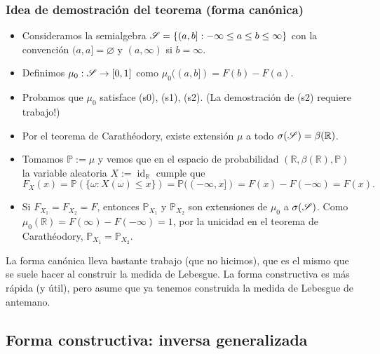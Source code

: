 \subsubsection{Idea de demostración del teorema (forma canónica)}

\begin{itemize}
	\item Consideramos la semialgebra \(\mathscr{S} = \{(a,b] : -\infty \le a \le b \le \infty\}\) con la convención \((a,a] = \varnothing\) y \((a,\infty)\) si \(b=\infty\).

    \item Definimos \(\mu_0: \mathscr{S} \to [0,1]\) como \(\mu_0((a,b]) = F(b) - F(a)\).

    \item Probamos que \(\mu_0\) satisface (s0), (s1), (s2). (La demostración de (s2) requiere trabajo!)

    \item Por el teorema de Carathéodory, existe extensión \(\mu\) a todo \(\sigma(\mathscr{S}) = \beta(\mathbb{R})\).

    \item Tomamos \(\mathbb{P} := \mu\) y vemos que en el espacio de probabilidad \((\mathbb{R}, \beta(\mathbb{R}), \mathbb{P})\) la variable aleatoria \(X := \operatorname{id}_{\mathbb{R}}\) cumple que
    \[
    F_X(x) = \mathbb{P}(\{\omega : X(\omega) \le x\}) = \mathbb{P}((-\infty, x]) = F(x) - F(-\infty) = F(x).
    \]

	\item Si \(F_{X_{1}} = F_{X_{2}} = F\), entonces \(\mathbb{P}_{X_{1}}\) y \(\mathbb{P}_{X_{2}}\) son extensiones de \(\mu_0\) a \(\sigma(\mathscr{S})\). Como \(\mu_0(\mathbb{R}) = F(\infty) - F(-\infty) = 1\), por la unicidad en el teorema de Carathéodory, \(\mathbb{P}_{X_{1}} = \mathbb{P}_{X_{2}}\).
\end{itemize}

\begin{remark}
    La forma canónica lleva bastante trabajo (que no hicimos), que es el mismo que se suele hacer al construir la medida de Lebesgue. La forma constructiva es más rápida (y útil), pero asume que ya tenemos construida la medida de Lebesgue de antemano.
\end{remark}

\subsection{Forma constructiva: inversa generalizada}

